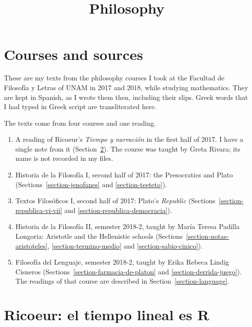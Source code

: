 



\title{Philosophy}
\maketitle

\label{section-phantom}

\tableofcontents

\section{Courses and sources}
\label{section-courses-and-sources}

These are my texts from the philosophy
courses I took at the Facultad de
Filosofía y Letras of UNAM in 2017 and
2018, while studying mathematics. They are
kept in Spanish, as I wrote them then,
including their slips. Greek words that I
had typed in Greek script are transliterated
here.

The texts come from four courses and one
reading.
\begin{enumerate}
\item A reading of Ricoeur's \emph{Tiempo y
narración} in the first half of 2017. I
have a single note from it
(Section~\ref{section-ricoeur-tiempo}).
The course was taught by Greta Rivara; its
name is not recorded in my files.
\item Historia de la Filosofía I, second
half of 2017: the Presocratics and Plato
(Sections~\ref{section-jenofanes} and
\ref{section-teeteto}).
\item Textos Filosóficos I, second half of
2017: Plato's \emph{Republic}
(Sections~\ref{section-republica-vi-vii} and
\ref{section-republica-democracia}).
\item Historia de la Filosofía II, semester
2018-2, taught by María Teresa Padilla
Longoria: Aristotle and the Hellenistic
schools
(Sections~\ref{section-notas-aristoteles},
\ref{section-termino-medio} and
\ref{section-sabio-cinico}).
\item Filosofía del Lenguaje, semester
2018-2, taught by Erika Rebeca Lindig
Cisneros
(Sections~\ref{section-farmacia-de-platon}
and \ref{section-derrida-juego}). The
readings of that course are described in
Section~\ref{section-language}.
\end{enumerate}

\section{Ricoeur: el tiempo lineal es R}
\label{section-ricoeur-tiempo}

